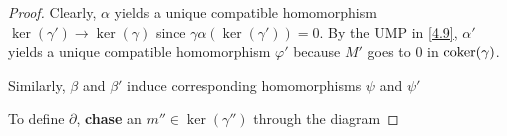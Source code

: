 \documentclass[11pt]{article}
\begin{document}
\begin{proof}
Clearly, \(\alpha\) yields a unique compatible homomorphism
\(\ker(\gamma')\to\ker(\gamma)\) since \(\gamma\alpha(\ker(\gamma'))=0\). By the
UMP in \ref{4.9}, \(\alpha'\) yields a unique compatible homomorphism \(\varphi'\) because
\(M'\) goes to 0 in \(\operatorname{coker}(\gamma)\).
\begin{center}
\end{center}
Similarly, \(\beta\) and \(\beta'\) induce corresponding homomorphisms \(\psi\) and
\(\psi'\)

To define \(\partial\), \textbf{chase} an \(m''\in\ker(\gamma'')\) through the diagram
\end{proof}
\end{document}
